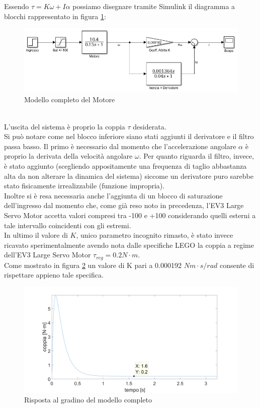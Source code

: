 Essendo $\tau=K\omega+I\alpha$ possiamo disegnare tramite Simulink il diagramma a blocchi rappresentato in figura \ref{modMotoreTorque}:
\begin{figure}[ht]
	\centering
	\includegraphics[width=\textwidth]{modMotoreTorque.jpg}
	\caption{Modello completo del Motore}
	\label{modMotoreTorque}
\end{figure}
\\L'uscita del sistema è proprio la coppia $\tau$ desiderata.\\
Si può notare come nel blocco inferiore siano stati aggiunti il derivatore e il filtro passa basso. Il primo è necessario dal momento che l'accelerazione angolare $\alpha$ è proprio la derivata della velocità angolare $\omega$. Per quanto riguarda il filtro, invece, è stato aggiunto (scegliendo appositamente una frequenza di taglio abbastanza alta da non alterare la dinamica del sistema) siccome un derivatore puro sarebbe stato fisicamente irrealizzabile (funzione impropria).\\
Inoltre si è resa necessaria anche l'aggiunta di un blocco di saturazione dell'ingresso dal momento che, come già reso noto in precedenza, l'EV3 Large Servo Motor accetta valori compresi tra -100 e +100 considerando quelli esterni a tale intervallo coincidenti con gli estremi.\\
In ultimo il valore di $K$, unico parametro incognito rimasto, è stato invece ricavato sperimentalmente avendo nota dalle specifiche LEGO la coppia a regime dell'EV3 Large Servo Motor $\tau_{reg}=0.2N\cdot m$.\\
Come mostrato in figura \ref{torque02} un valore di K pari a 0.000192 $Nm\cdot s/rad$ consente di rispettare appieno tale specifica.
\begin{figure}[ht]
	\centering
	\includegraphics[width=\textwidth]{torque192.png}
	\caption{Risposta al gradino del modello completo}
	\label{torque02}
\end{figure}